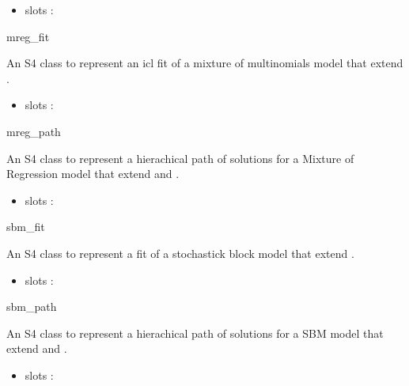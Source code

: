 \documentclass[letterpaper]{book}
\begin{document}
\begin{Description}
\begin{itemize}
\item slots : 

\end{itemize}


mreg\_fit

An S4 class to represent an icl fit of a mixture of multinomials model that extend .
\begin{itemize}

\item slots : 

\end{itemize}


mreg\_path

An S4 class to represent a hierachical path of solutions for a Mixture of Regression model that extend  and .
\begin{itemize}

\item slots : 

\end{itemize}


sbm\_fit

An S4 class to represent a fit of a stochastick block model that extend .
\begin{itemize}

\item slots : 

\end{itemize}


sbm\_path

An S4 class to represent a hierachical path of solutions for a SBM model that extend  and .
\begin{itemize}

\item slots : 

\end{itemize}

\end{Description}
%
\end{document}

